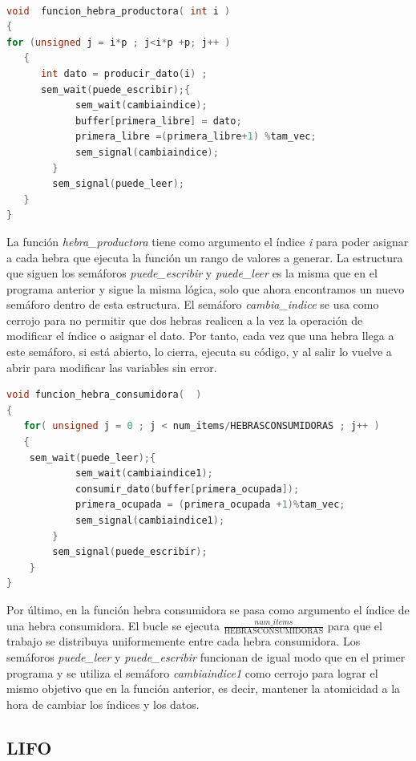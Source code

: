 \documentclass{article}
\begin{document}
\begin{lstlisting}[language=C++,caption=función hebra productora multiple (FIFO) ] 

void  funcion_hebra_productora( int i )
{
for (unsigned j = i*p ; j<i*p +p; j++ )
   {
      int dato = producir_dato(i) ;
	  sem_wait(puede_escribir);{
			sem_wait(cambiaindice);
			buffer[primera_libre] = dato;
			primera_libre =(primera_libre+1) %tam_vec;
			sem_signal(cambiaindice);
		}
		sem_signal(puede_leer);
   }
}
\end{lstlisting}
La función \textit{hebra\_productora} tiene como argumento el índice \textit{i} para poder asignar a cada hebra que ejecuta la función un rango de valores a generar. La estructura que siguen los semáforos \textit{puede\_escribir} y \textit{puede\_leer} es la misma que en el programa anterior y sigue la misma lógica, solo que ahora encontramos un nuevo semáforo dentro de esta estructura. El semáforo \textit{cambia\_indice} se usa como cerrojo para no permitir que dos hebras realicen a la vez la operación de modificar el índice o asignar el dato. Por tanto, cada vez que una hebra llega a este semáforo, si está abierto, lo cierra, ejecuta su código, y al salir lo vuelve a abrir para modificar las variables sin error.
 
\begin{lstlisting}[language=C++,caption=función hebra consumidora multiple (FIFO) ] 
void funcion_hebra_consumidora(  )
{
   for( unsigned j = 0 ; j < num_items/HEBRASCONSUMIDORAS ; j++ )
   {
	sem_wait(puede_leer);{
			sem_wait(cambiaindice1);
	        consumir_dato(buffer[primera_ocupada]);
			primera_ocupada = (primera_ocupada +1)%tam_vec;
			sem_signal(cambiaindice1);
		}
		sem_signal(puede_escribir);
    }
}
\end{lstlisting}

Por último, en la función hebra consumidora se pasa como argumento el índice de una hebra consumidora. El bucle se ejecuta $\frac{num\_items}{\text{HEBRASCONSUMIDORAS}}$ para que el trabajo se distribuya uniformemente entre cada hebra consumidora. Los semáforos \textit{puede\_leer} y \textit{puede\_escribir} funcionan de igual modo que en el primer programa y se utiliza el semáforo \textit{cambiaindice1} como cerrojo para lograr el mismo objetivo que en la función anterior, es decir, mantener la atomicidad a la hora de cambiar los índices y los datos.


\subsection{LIFO}
\end{document}
